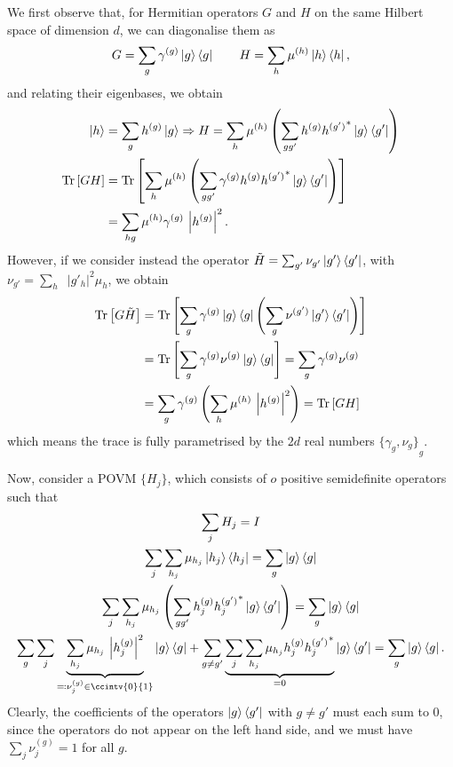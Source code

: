 \documentclass[10pt, a4paper]{article}
\numberwithin{equation}{section} %
\theoremstyle{definition}
\theoremstyle{plain}
\newcommand{\abs}[1]{\mathop{}\left\lvert#1\right\rvert}
\newcommand{\?}{\mathrel{?}} %
\newcommand{\Tr}[2][]{\mathop{\mathrm{Tr}#1}\left[ #2 \right]} %
\begin{document}
\begin{appendices}
                      We first observe that, for Hermitian operators \(G\) and \(H\) on the same Hilbert space of dimension \(d\), we can diagonalise them as
                      \[ G = \sum_g \gamma^{(g)} \ket{g}\bra{g} \qquad H = \sum_h \mu^{(h)} \ket{h}\bra{h}, \]
                      and relating their eigenbases, we obtain
                      \begin{align*}
                        \ket{h} &= \sum_g h^{(g)} \ket{g} \Rightarrow H = \sum_h \mu^{(h)} \left(\sum_{gg'} h^{(g)} {h^{(g')}}^* \ket{g}\bra{g'}\right) \\
                      \Tr{GH} &= \Tr{ \sum_h \mu^{(h)} \left( \sum_{gg'} \gamma^{(g)} h^{(g)} {h^{(g')}}^* \ket{g}\bra{g'} \right) } \\
                                &= \sum_{hg} \mu^{(h)} \gamma^{(g)} \abs{h^{(g)}}^2.
                      \end{align*}
                      However, if we consider instead the operator \(\tilde{H} = \sum_{g'} \nu_{g'} \ket{g'}\bra{g'}\), with \(\nu_{g'} = \sum_h \abs{g'_h}^2 \mu_h\), we obtain
                      \begin{align*}
                      \Tr{G\tilde{H}} &= \Tr{ \sum_{g} \gamma^{(g)} \ket{g}\bra{g} \left( \sum_g \nu^{(g')} \ket{g'}\bra{g'} \right) } \\
                                        &= \Tr{ \sum_{g} \gamma^{(g)}\nu^{(g)}\ket{g}\bra{g} } = \sum_{g} \gamma^{(g)}\nu^{(g)} \\
                                        &= \sum_{g} \gamma^{(g)} \left(\sum_{h} \mu^{(h)} \abs{h^{(g)}}^2\right) = \Tr{GH}
                      \end{align*}
                      which means the trace is fully parametrised by the \(2d\) real numbers \({\{\gamma_g, \nu_{g}\}}_{g}\).

                      Now, consider a POVM \(\{H_j\}\), which consists of \(o\) positive semidefinite operators such that
                      \begin{gather*}
                        \sum_j H_j = I \\
                        \sum_j \sum_{h_j} \mu_{h_j} \ket{h_j}\bra{h_j} = \sum_g \ket{g}\bra{g} \\
                        \sum_j \sum_{h_j} \mu_{h_j} \left(\sum_{gg'} h_j^{(g)} {h_j^{(g')}}^* \ket{g}\bra{g'}\right) = \sum_g \ket{g}\bra{g} \\
                        \sum_{g} \sum_j \underbrace{\sum_{h_j} \mu_{h_j} \abs{h_j^{(g)}}^2}_{\eqqcolon \nu^{(g)}_j \in \ccintv{0}{1}} \ket{g}\bra{g} + \sum_{g \neq g'} \underbrace{ \sum_j \sum_{h_j} \mu_{h_j} h_j^{(g)} {h_j^{(g')}}^* }_{=0} \ket{g}\bra{g'} = \sum_g \ket{g}\bra{g}.
                      \end{gather*}
                      Clearly, the coefficients of the operators \(\ket{g}\bra{g'}\) with \(g \neq g'\) must each sum to 0, since the operators do not appear on the left hand side, and we must have \(\sum_j \nu^{(g)}_j = 1\) for all \(g\).


\end{appendices}
\end{document}
